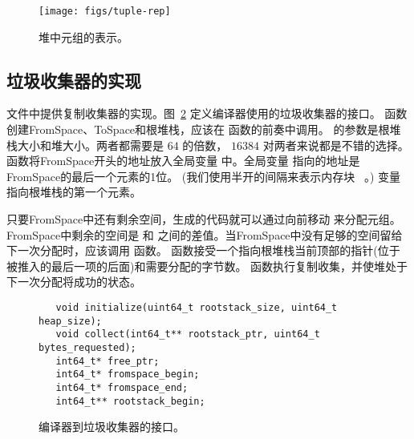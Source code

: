 \documentclass[11pt]{book}
\begin{document}
\begin{figure}[tbp]
\centering \texttt{[image: figs/tuple-rep]}
\caption{堆中元组的表示。}
\label{fig:tuple-rep}
\end{figure}

\subsection{垃圾收集器的实现}
\label{sec:organize-gz}

 文件中提供复制收集器的实现。图~\ref{fig:gc-header} 定义编译器使用的垃圾收集器的接口。
 函数创建FromSpace、ToSpace和根堆栈，应该在 
函数的前奏中调用。  的参数是根堆栈大小和堆大小。两者都需要是 $64$ 的倍数， $16384$ 对两者来说都是不错的选择。  函数将FromSpace开头的地址放入全局变量
 中。全局变量  指向的地址是FromSpace的最后一个元素的1位。 (我们使用半开的间隔来表示内存块~\citep{Dijkstra:1982aa} 。)    变量指向根堆栈的第一个元素。

只要FromSpace中还有剩余空间，生成的代码就可以通过向前移动  来分配元组。
%
FromSpace中剩余的空间是
 和  之间的差值。当FromSpace中没有足够的空间留给下一次分配时，应该调用 
函数。  函数接受一个指向根堆栈当前顶部的指针(位于被推入的最后一项的后面)和需要分配的字节数。  函数执行复制收集，并使堆处于下一次分配将成功的状态。

\begin{figure}[tbp]
\begin{lstlisting}
   void initialize(uint64_t rootstack_size, uint64_t heap_size);
   void collect(int64_t** rootstack_ptr, uint64_t bytes_requested);
   int64_t* free_ptr;
   int64_t* fromspace_begin;
   int64_t* fromspace_end;
   int64_t** rootstack_begin;
\end{lstlisting}
\caption{编译器到垃圾收集器的接口。}
\label{fig:gc-header}
\end{figure}
\end{document}
